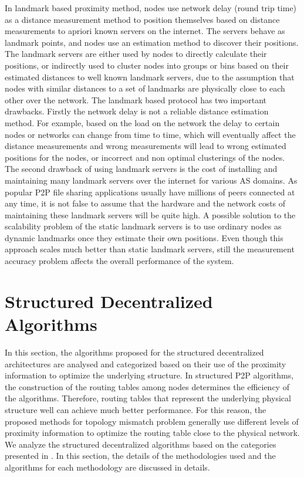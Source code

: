 \documentclass[acmcsur]{acmtrans2m}
\begin{document}
In landmark based proximity method, nodes use network delay (round trip
time) as a distance measurement method to position themselves based on distance
measurements to apriori known servers on the internet. The servers behave as
landmark points, and nodes use an estimation method to discover their positions.
The landmark servers are either used by nodes to directly calculate their
positions, or indirectly used to cluster nodes into groups or bins based on
their estimated distances to well known landmark servers, due to the assumption
that nodes with similar distances to a set of landmarks are physically close to
each other over the network. The landmark based protocol has two important
drawbacks. Firstly the network delay is not a reliable distance estimation
method. For example, based on the load on the network the delay to certain
nodes or networks can change from time to time, which will eventually affect the
distance measurements and wrong measurements will lead to wrong estimated positions for the
nodes, or incorrect and non optimal clusterings of the nodes. The second drawback of
using landmark servers is the cost of installing and maintaining many landmark servers over the internet
for various AS domains. As popular P2P file sharing applications usually have
millions of peers connected at any time, it is not false to assume that the hardware and the network costs of
maintaining these landmark servers will be quite high. 
A possible solution to the scalability problem of the static landmark servers is to use ordinary nodes as dynamic
landmarks once they estimate their own positions. Even though this approach scales
much better than static landmark servers, still the measurement accuracy problem affects
the overall performance of the system.


\section{Structured Decentralized Algorithms}\label{sec:structured}

In this section, the algorithms proposed for the structured decentralized
architectures are analysed and categorized based on their use of the proximity
information to optimize the underlying structure. In structured P2P algorithms,
the construction of the routing tables among nodes determines the efficiency of
the algorithms.  Therefore, routing tables that represent the underlying
physical structure well can achieve much better performance. For this reason,
the proposed methods for topology mismatch problem generally use different
levels of proximity information to optimize the routing table close to the
physical network. We analyze the structured decentralized algorithms based on
the categories presented in
\cite{castro_proximitydht_2002,castro_topawareroute_2002,ratnasamy_openq_2002}.
In this section, the details of the methodologies used and the algorithms for
each methodology are discussed in details.
\end{document}
